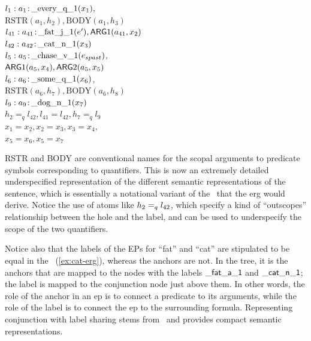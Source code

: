 \begin{examples}
\item $l_1:a_1\colon\!\mbox{\_every\_q\_1}(x_1),$\\
\hspace*{0.1in}$\mbox{RSTR}(a_1,h_2),
\mbox{BODY}(a_1,h_3)$\\ 
$l_{41}:a_{41}\colon\!\mbox{\_fat\_j\_1}(e'), \mathsf{ARG}1(a_{41},x_2)$\\
$l_{42}:a_{42}\colon\!\mbox{\_cat\_n\_1}(x_3)$\\
$l_5:a_5\colon\!\mbox{\_chase\_v\_1}(e_{spast})$,\\
\hspace*{0.1in}$\mathsf{ARG}1(a_5,x_4),
\mathsf{ARG}2(a_5,x_5)$\\ 
$l_6:a_6\colon\!\mbox{\_some\_q\_1}(x_6)$,\\
\hspace*{0.1in}$\mbox{RSTR}(a_6,h_7),
\mbox{BODY}(a_6,h_8)$\\ 
$l_9:a_9\colon\!\mbox{\_dog\_n\_1}(x_7)$\\
$h_2=_q l_{42}, l_{41}=l_{42}, h_7 =_q l_9$\\
$x_1=x_2, x_2=x_3, x_3=x_4,$\\
$x_5=x_6, x_5=x_7$
\label{ex:cat-erg}
\end{examples}
RSTR and BODY are conventional names for the scopal arguments to
predicate symbols corresponding to quantifiers.  
This is now an extremely detailed underspecified representation of the
different semantic representations of the sentence, which is
essentially a notational variant of the \mrs\ that the {\sc erg} would
derive.  Notice the use of atoms like $h_2 =_q l_{42}$, which specify
a kind of ``outscopes'' relationship between the hole and the label,
and can be used to underspecify the scope of the two quantifiers.  


Notice also that the labels of the EPs for ``fat'' and ``cat'' are
stipulated to be equal in the \rmrs\ (\ref{ex:cat-erg}), whereas the
anchors are not. 
In the tree, it is the anchors that are mapped to the nodes with the
labels $\mathsf{\_fat\_a\_1}$ and $\mathsf{\_cat\_n\_1}$; the label is
mapped to the conjunction node just above them.  In other words, the
role of the anchor in an {\sc ep} is to connect a predicate to its
arguments, while the role of the label is to connect the {\sc ep} to the
surrounding formula.  Representing conjunction with label sharing
stems from \mrs\ and provides compact semantic representations. 

